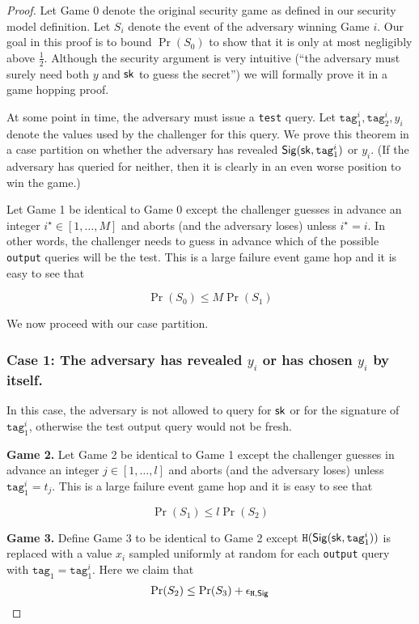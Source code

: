 \documentclass{article}
\begin{document}
\begin{proof}
Let Game 0 denote the original security game as defined in our security model definition. Let $S_i$ denote the event of the adversary winning Game $i$. Our goal in this proof is to bound $\Pr(S_0)$ to show that it is only at most negligibly above $\frac{1}{2}$. Although the security argument is very intuitive (``the adversary must surely need both $y$ and $\mathsf{sk}$ to guess the secret'') we will formally prove it in a game hopping proof.

At some point in time, the adversary must issue a \texttt{test} query. Let $\texttt{tag}_1^i, \texttt{tag}_2^i, y_i$ denote the values used by the challenger for this query. We prove this theorem in a case partition on whether the adversary has revealed $\mathsf{Sig}(\mathsf{sk},\texttt{tag}_1^i)$ or $y_i$. (If the adversary has queried for neither, then it is clearly in an even worse position to win the game.) 

Let Game 1 be identical to Game 0 except the challenger guesses in advance an integer $i^{\star} \in [1, \dots, M]$ and aborts (and the adversary loses) unless $i^{\star} = i$. In other words, the challenger needs to guess in advance which of the possible \texttt{output} queries will be the test. This is a large failure event game hop and it is easy to see that

$$
\Pr(S_0) \le M \Pr(S_1)
$$

\noindent We now proceed with our case partition.

\subsubsection*{Case 1: The adversary has revealed $y_i$ or has chosen $y_i$ by itself.} In this case, the adversary is not allowed to query for $\mathsf{sk}$ or for the signature of $\texttt{tag}_1^i$, otherwise the test output query would not be fresh.

\noindent \textbf{Game 2.} Let Game 2 be identical to Game 1 except the challenger guesses in advance an integer $j \in [1, \dots, l]$ and aborts (and the adversary loses) unless $\texttt{tag}_1^i = t_j$.  This is a large failure event game hop and it is easy to see that

$$
\Pr(S_1) \le l \Pr(S_2)
$$


\noindent \textbf{Game 3.} Define Game 3 to be identical to Game 2 except $\texttt{H}(\mathsf{Sig}(\mathsf{sk}, \texttt{tag}_1^i))$ is replaced with a value $x_i$ sampled uniformly at random for each  \texttt{output} query with $\texttt{tag}_1 = \texttt{tag}_1^i$. Here we claim that
$$\Pr(S_2) \le  \Pr(S_3) + \epsilon_{\texttt{H}, \mathsf{Sig}}$$


\end{proof}
\end{document}
